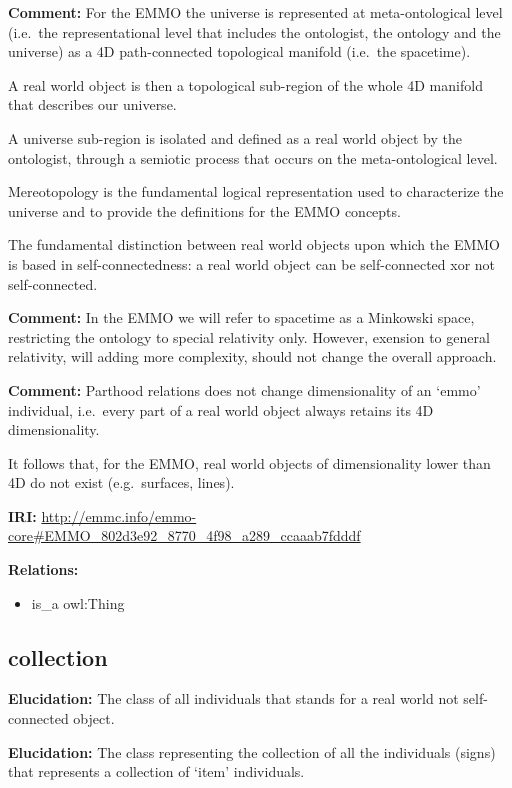 \documentclass[a4paper,]{report}
\providecommand{\tightlist}{%
  \setlength{\itemsep}{0pt}\setlength{\parskip}{0pt}}
\begin{document}
\textbf{Comment:} For the EMMO the universe is represented at
meta-ontological level (i.e.~the representational level that includes
the ontologist, the ontology and the universe) as a 4D path-connected
topological manifold (i.e.~the spacetime).

A real world object is then a topological sub-region of the whole 4D
manifold that describes our universe.

A universe sub-region is isolated and defined as a real world object by
the ontologist, through a semiotic process that occurs on the
meta-ontological level.

Mereotopology is the fundamental logical representation used to
characterize the universe and to provide the definitions for the EMMO
concepts.

The fundamental distinction between real world objects upon which the
EMMO is based in self-connectedness: a real world object can be
self-connected xor not self-connected.

\textbf{Comment:} In the EMMO we will refer to spacetime as a Minkowski
space, restricting the ontology to special relativity only. However,
exension to general relativity, will adding more complexity, should not
change the overall approach.

\textbf{Comment:} Parthood relations does not change dimensionality of
an `emmo' individual, i.e.~every part of a real world object always
retains its 4D dimensionality.

It follows that, for the EMMO, real world objects of dimensionality
lower than 4D do not exist (e.g.~surfaces, lines).

\textbf{IRI:}
\url{http://emmc.info/emmo-core\#EMMO_802d3e92_8770_4f98_a289_ccaaab7fdddf}

\textbf{Relations:}

\begin{itemize}
\tightlist
\item
  is\_a owl:Thing
\end{itemize}

\hypertarget{collection}{%
\subsection{collection}\label{collection}}

\textbf{Elucidation:} The class of all individuals that stands for a
real world not self-connected object.

\textbf{Elucidation:} The class representing the collection of all the
individuals (signs) that represents a collection of `item' individuals.
\end{document}
